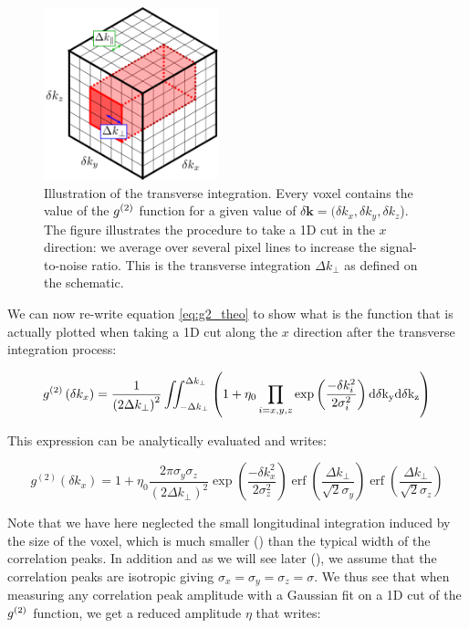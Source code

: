 \begin{figure}
    \centering
    \includegraphics[width=0.45\textwidth]{Fig/Chapter4/cube_integration.png}
    \caption{Illustration of the transverse integration. Every voxel contains the value of the $g^{(2)}$ function for a given value of $\delta \bm{k}=(\delta k_x, \delta k_y, \delta k_z$). The figure illustrates the procedure to take a 1D cut in the $x$ direction: we average over several pixel lines to increase the signal-to-noise ratio. This is the transverse integration $\Delta k_{\perp}$ as defined on the schematic.}
    \label{fig:cube_integration}
\end{figure}

We can now re-write equation \ref{eq:g2_theo} to show what is the function that is actually plotted when taking a 1D cut along the $x$ direction after the transverse integration process:

\begin{equation}
    g^{(2)} \left(\delta k_{x}\right)=\frac{1}{\left(2 \Delta k_{\perp}\right)^{2}} \iint_{-\Delta k_{\perp}}^{\Delta k_{\perp}} \left( 1+ \eta_0 \prod_{i=x, y, z} \exp \left(\frac{-\delta k_{i}^{2}}{2 \sigma_i^{2}}\right) \rm{d} \delta k_y \rm{d} \delta k_z \right)
\end{equation}

This expression can be analytically evaluated and writes:

\begin{equation}
    g^{(2)} \left(\delta k_{x}\right)=1+\eta_0 \frac{2 \pi \sigma_y \sigma_z}{\left(2 \Delta k_{\perp}\right)^{2}} \exp \left(\frac{-\delta k_{x}^{2}}{2 \sigma_{z}^{2}}\right) \operatorname{erf}\left(\frac{\Delta k_{\perp}}{\sqrt{2} \sigma_{y}}\right) \operatorname{erf}\left(\frac{\Delta k_{\perp}}{\sqrt{2} \sigma_{z}}\right)
\end{equation}

Note that we have here neglected the small longitudinal integration induced by the size of the voxel, which is much smaller () than the typical width of the correlation peaks. In addition and as we will see later (), we assume that the correlation peaks are isotropic giving $\sigma_x=\sigma_y=\sigma_z=\sigma$. We thus see that when measuring any correlation peak amplitude with a Gaussian fit on a 1D cut of the $g^{(2)}$ function, we get a reduced amplitude $\eta$ that writes:

